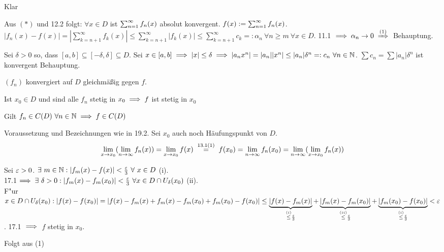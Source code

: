 \documentclass[a4paper,twoside,DIV15,BCOR12mm]{scrbook}
\begin{document}
\begin{beweise}
\item Klar
\item Aus $(*)$ und 12.2 folgt: $\forall x\in D$ ist $\sum_{n=1}^{\infty}{f_n(x)}$ absolut konvergent. $f(x) := \sum_{n=1}^{\infty}{f_n(x)}$. $|f_n(x) - f(x)| = |\sum_{k=n+1}^\infty f_k(x)| \le \sum_{k=n+1}^\infty |f_k(x)| \le \sum_{k=n+1}^\infty c_k =: \alpha_n \ \forall n\ge m \ \forall x \in D$. 11.1 $\folgt \alpha_n \to 0 \folgtnach{(1)}$ Behauptung.
\item Sei $\delta>0$ so, dass $[a,b] \subseteq [-\delta, \delta] \subseteq D$. Sei $x\in[a,b] \implies |x| \le \delta \implies |a_nx^n| = |a_n||x^n| \le |a_n|\delta^n =: c_n \ \forall n\in\mathbb{N}$. $\sum{c_n} = \sum{|a_n|\delta^n}$ ist konvergent  Behauptung.
\end{beweise}

\begin{satz}
$(f_n)$ konvergiert auf $D$ gleichmäßig gegen $f$.
\begin{liste}
\item Ist $x_0\in D$ und sind alle $f_n$ stetig in $x_0 \implies f$ ist stetig in $x_0$
\item Gilt $f_n \in C(D) \ \forall n\in\mathbb{N} \implies f \in C(D)$
\end{liste}
\end{satz}

\begin{bemerkung}
Voraussetzung und Bezeichnungen wie in 19.2. Sei $x_0$ auch noch Häufungspunkt von $D$.
$$ \lim_{x\to x_0} (\lim_{n\to\infty} f_n(x)) = \lim_{x\to x_0}f(x) \gleichnach{13.1(1)}f(x_0) = \lim_{n\to\infty} f_n(x_0) = \lim_{n\to\infty} (\lim_{x\to x_0} f_n(x))$$
\end{bemerkung}

\begin{beweise}
\item Sei $\varepsilon>0$. $\exists\ m \in\MdN: |f_m(x)-f(x)|<\frac{\ep}{3}\ \forall\ x\in D$ (i).\\
 17.1$\implies \exists\ \delta>0: |f_m(x)-f_m(x_0)|<\frac{\varepsilon}{3}\ \forall x \in D \cap U_{\delta}(x_0)$ (ii). \\
 F"ur $x \in D\cap U_{\delta}(x_0): |f(x)-f(x_0)|=|f(x)-f_m(x)+f_m(x)-f_m(x_0)+f_m(x_0)-f(x_0)|\le \underbrace{|f(x)-f_m(x)|}_{\stackrel{(i)}{\le}\frac{\varepsilon}{3}}+\underbrace{|f_m(x)-f_m(x_0)|}_{\stackrel{(ii)}{\le}\frac{\varepsilon}{3}}+\underbrace{|f_m(x_0)-f(x_0)|}_{\stackrel{(i)}{\le}\frac{\varepsilon}{3}}<\varepsilon$. 17.1 $\implies$ $f$ stetig in $x_0$.
\item Folgt aus (1)
\end{beweise}
\end{document}

